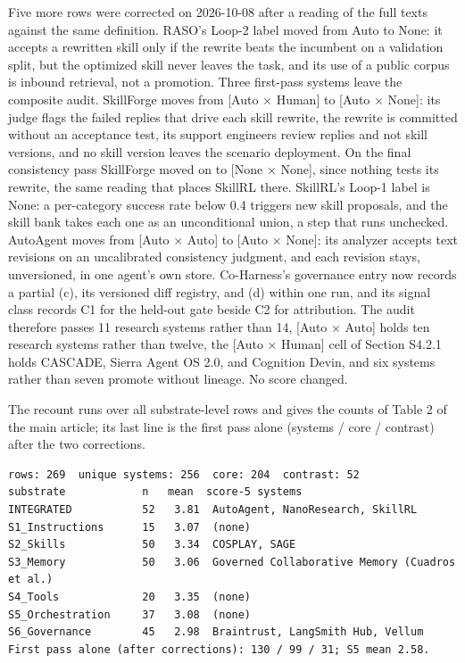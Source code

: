 \documentclass[
]{article}
\newcounter{none} %
\begin{document}
Five more rows were corrected on 2026-10-08 after a reading of the full
texts against the same definition. RASO's Loop-2 label moved from Auto
to None: it accepts a rewritten skill only if the rewrite beats the
incumbent on a validation split, but the optimized skill never leaves
the task, and its use of a public corpus is inbound retrieval, not a
promotion. Three first-pass systems leave the composite audit.
SkillForge moves from {[}Auto × Human{]} to {[}Auto × None{]}: its judge
flags the failed replies that drive each skill rewrite, the rewrite is
committed without an acceptance test, its support engineers review
replies and not skill versions, and no skill version leaves the scenario
deployment. On the final consistency pass SkillForge moved on to {[}None
× None{]}, since nothing tests its rewrite, the same reading that places
SkillRL there. SkillRL's Loop-1 label is None: a per-category success
rate below 0.4 triggers new skill proposals, and the skill bank takes
each one as an unconditional union, a step that runs unchecked.
AutoAgent moves from {[}Auto × Auto{]} to {[}Auto × None{]}: its
analyzer accepts text revisions on an uncalibrated consistency judgment,
and each revision stays, unversioned, in one agent's own store.
Co-Harness's governance entry now records a partial (c), its versioned
diff registry, and (d) within one run, and its signal class records C1
for the held-out gate beside C2 for attribution. The audit therefore
passes 11 research systems rather than 14, {[}Auto × Auto{]} holds ten
research systems rather than twelve, the {[}Auto × Human{]} cell of
Section S4.2.1 holds CASCADE, Sierra Agent OS 2.0, and Cognition Devin,
and six systems rather than seven promote without lineage. No score
changed.

The recount runs over all substrate-level rows and gives the counts of
Table 2 of the main article; its last line is the first pass alone
(systems / core / contrast) after the two corrections.

\begin{verbatim}
rows: 269  unique systems: 256  core: 204  contrast: 52
substrate            n   mean  score-5 systems
INTEGRATED           52   3.81  AutoAgent, NanoResearch, SkillRL
S1_Instructions      15   3.07  (none)
S2_Skills            50   3.34  COSPLAY, SAGE
S3_Memory            50   3.06  Governed Collaborative Memory (Cuadros et al.)
S4_Tools             20   3.35  (none)
S5_Orchestration     37   3.08  (none)
S6_Governance        45   2.98  Braintrust, LangSmith Hub, Vellum
First pass alone (after corrections): 130 / 99 / 31; S5 mean 2.58.
\end{verbatim}
\end{document}

